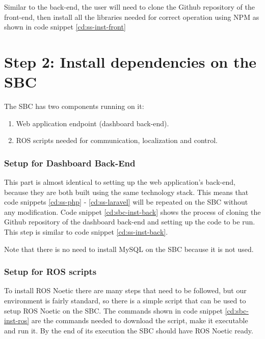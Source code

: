 Similar to the back-end, the user will need to clone the Github repository of the front-end, then install all the libraries needed for correct operation using NPM as shown in code snippet \ref{cd:ss-inst-front}

\newpage

\section{Step 2: Install dependencies on the SBC}
The SBC has two components running on it:
\begin{enumerate}
	\item Web application endpoint (dashboard back-end).
	\item ROS scripts needed for communication, localization and control.
\end{enumerate}

\subsubsection{Setup for Dashboard Back-End}
This part is almost identical to setting up the web application's back-end, because they are both built using the same technology stack. This means that code snippets \ref{cd:ss-php} - \ref{cd:ss-laravel} will be repeated on the SBC without any modification. Code snippet \ref{cd:sbc-inst-back} shows the process of cloning the Github repository of the dashboard back-end and setting up the code to be run. This step is similar to code snippet \ref{cd:ss-inst-back}.


Note that there is no need to install MySQL on the SBC because it is not used.

\subsubsection{Setup for ROS scripts}
To install ROS Noetic there are many steps that need to be followed, but our environment is fairly standard, so there is a simple script that can be used to setup ROS Noetic on the SBC. The commands shown in code snippet \ref{cd:sbc-inst-ros} are the commands needed to download the script, make it executable and run it. By the end of its execution the SBC should have ROS Noetic ready. 

